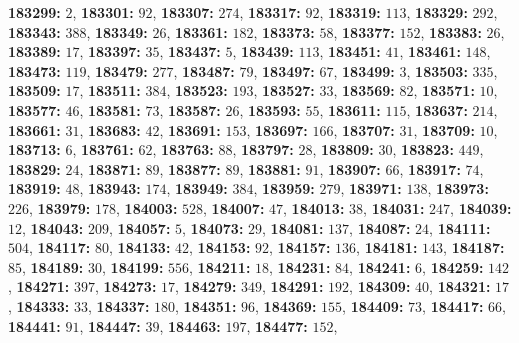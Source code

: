 \textsf{\bfseries 183299:} $2$, \textsf{\bfseries 183301:} $92$, \textsf{\bfseries 183307:} $274$, \textsf{\bfseries 183317:} $92$, \textsf{\bfseries 183319:} $113$, \textsf{\bfseries 183329:} $292$, \textsf{\bfseries 183343:} $388$, \textsf{\bfseries 183349:} $26$, \textsf{\bfseries 183361:} $182$, \textsf{\bfseries 183373:} $58$, \textsf{\bfseries 183377:} $152$, \textsf{\bfseries 183383:} $26$, \textsf{\bfseries 183389:} $17$, \textsf{\bfseries 183397:} $35$, \textsf{\bfseries 183437:} $5$, \textsf{\bfseries 183439:} $113$, \textsf{\bfseries 183451:} $41$, \textsf{\bfseries 183461:} $148$, \textsf{\bfseries 183473:} $119$, \textsf{\bfseries 183479:} $277$, \textsf{\bfseries 183487:} $79$, \textsf{\bfseries 183497:} $67$, \textsf{\bfseries 183499:} $3$, \textsf{\bfseries 183503:} $335$, \textsf{\bfseries 183509:} $17$, \textsf{\bfseries 183511:} $384$, \textsf{\bfseries 183523:} $193$, \textsf{\bfseries 183527:} $33$, \textsf{\bfseries 183569:} $82$, \textsf{\bfseries 183571:} $10$, \textsf{\bfseries 183577:} $46$, \textsf{\bfseries 183581:} $73$, \textsf{\bfseries 183587:} $26$, \textsf{\bfseries 183593:} $55$, \textsf{\bfseries 183611:} $115$, \textsf{\bfseries 183637:} $214$, \textsf{\bfseries 183661:} $31$, \textsf{\bfseries 183683:} $42$, \textsf{\bfseries 183691:} $153$, \textsf{\bfseries 183697:} $166$, \textsf{\bfseries 183707:} $31$, \textsf{\bfseries 183709:} $10$, \textsf{\bfseries 183713:} $6$, \textsf{\bfseries 183761:} $62$, \textsf{\bfseries 183763:} $88$, \textsf{\bfseries 183797:} $28$, \textsf{\bfseries 183809:} $30$, \textsf{\bfseries 183823:} $449$, \textsf{\bfseries 183829:} $24$, \textsf{\bfseries 183871:} $89$, \textsf{\bfseries 183877:} $89$, \textsf{\bfseries 183881:} $91$, \textsf{\bfseries 183907:} $66$, \textsf{\bfseries 183917:} $74$, \textsf{\bfseries 183919:} $48$, \textsf{\bfseries 183943:} $174$, \textsf{\bfseries 183949:} $384$, \textsf{\bfseries 183959:} $279$, \textsf{\bfseries 183971:} $138$, \textsf{\bfseries 183973:} $226$, \textsf{\bfseries 183979:} $178$, \textsf{\bfseries 184003:} $528$, \textsf{\bfseries 184007:} $47$, \textsf{\bfseries 184013:} $38$, \textsf{\bfseries 184031:} $247$, \textsf{\bfseries 184039:} $12$, \textsf{\bfseries 184043:} $209$, \textsf{\bfseries 184057:} $5$, \textsf{\bfseries 184073:} $29$, \textsf{\bfseries 184081:} $137$, \textsf{\bfseries 184087:} $24$, \textsf{\bfseries 184111:} $504$, \textsf{\bfseries 184117:} $80$, \textsf{\bfseries 184133:} $42$, \textsf{\bfseries 184153:} $92$, \textsf{\bfseries 184157:} $136$, \textsf{\bfseries 184181:} $143$, \textsf{\bfseries 184187:} $85$, \textsf{\bfseries 184189:} $30$, \textsf{\bfseries 184199:} $556$, \textsf{\bfseries 184211:} $18$, \textsf{\bfseries 184231:} $84$, \textsf{\bfseries 184241:} $6$, \textsf{\bfseries 184259:} $142$, \textsf{\bfseries 184271:} $397$, \textsf{\bfseries 184273:} $17$, \textsf{\bfseries 184279:} $349$, \textsf{\bfseries 184291:} $192$, \textsf{\bfseries 184309:} $40$, \textsf{\bfseries 184321:} $17$, \textsf{\bfseries 184333:} $33$, \textsf{\bfseries 184337:} $180$, \textsf{\bfseries 184351:} $96$, \textsf{\bfseries 184369:} $155$, \textsf{\bfseries 184409:} $73$, \textsf{\bfseries 184417:} $66$, \textsf{\bfseries 184441:} $91$, \textsf{\bfseries 184447:} $39$, \textsf{\bfseries 184463:} $197$, \textsf{\bfseries 184477:} $152$, 
